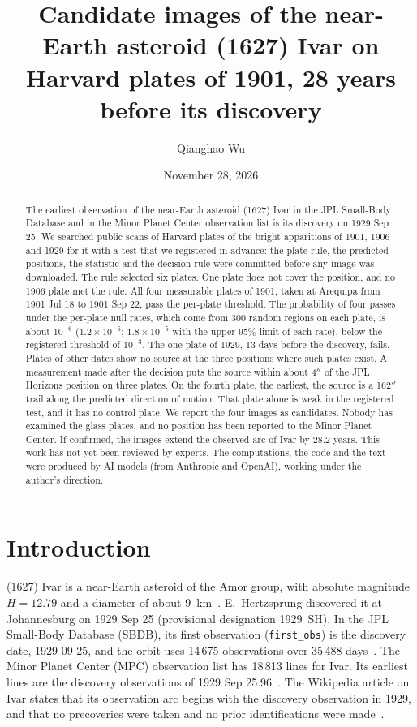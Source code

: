 \documentclass[11pt]{article}
\title{Candidate images of the near-Earth asteroid (1627) Ivar on Harvard plates of 1901, 28 years before its discovery}
\author{Qianghao Wu}
\date{November 28, 2026}
\newcommand{\as}{$''$}
\begin{document}
\sloppy
\maketitle

\begin{abstract}
The earliest observation of the near-Earth asteroid (1627) Ivar in the JPL Small-Body Database and in the Minor Planet Center observation list is its discovery on 1929 Sep 25. We searched public scans of Harvard plates of the bright apparitions of 1901, 1906 and 1929 for it with a test that we registered in advance: the plate rule, the predicted positions, the statistic and the decision rule were committed before any image was downloaded. The rule selected six plates. One plate does not cover the position, and no 1906 plate met the rule. All four measurable plates of 1901, taken at Arequipa from 1901 Jul 18 to 1901 Sep 22, pass the per-plate threshold. The probability of four passes under the per-plate null rates, which come from 300 random regions on each plate, is about $10^{-6}$ ($1.2\times10^{-6}$; $1.8\times10^{-5}$ with the upper 95\% limit of each rate), below the registered threshold of $10^{-3}$. The one plate of 1929, 13 days before the discovery, fails. Plates of other dates show no source at the three positions where such plates exist. A measurement made after the decision puts the source within about 4\as{} of the JPL Horizons position on three plates. On the fourth plate, the earliest, the source is a 162\as{} trail along the predicted direction of motion. That plate alone is weak in the registered test, and it has no control plate. We report the four images as candidates. Nobody has examined the glass plates, and no position has been reported to the Minor Planet Center. If confirmed, the images extend the observed arc of Ivar by 28.2 years.
This work has not yet been reviewed by experts. The computations, the code and the text were produced by AI models (from Anthropic and OpenAI), working under the author's direction.
\end{abstract}

\section{Introduction}
(1627) Ivar is a near-Earth asteroid of the Amor group, with absolute magnitude $H=12.79$ and a diameter of about 9~km~\cite{sbdb}. E.~Hertzsprung discovered it at Johannesburg on 1929 Sep 25 (provisional designation 1929~SH). In the JPL Small-Body Database (SBDB), its first observation (\texttt{first\_obs}) is the discovery date, 1929-09-25, and the orbit uses 14\,675 observations over 35\,488 days~\cite{sbdb}. The Minor Planet Center (MPC) observation list has 18\,813 lines for Ivar. Its earliest lines are the discovery observations of 1929 Sep 25.96~\cite{mpcobs}. The Wikipedia article on Ivar states that its observation arc begins with the discovery observation in 1929, and that no precoveries were taken and no prior identifications were made~\cite{wiki}.
\end{document}

